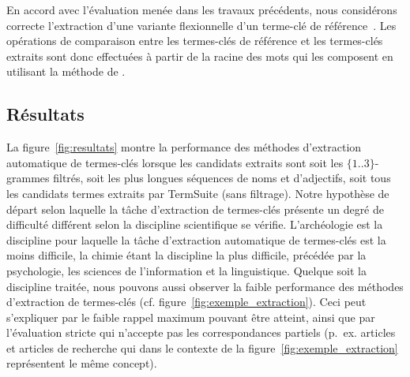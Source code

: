     En accord avec l'évaluation menée dans les travaux précédents, nous
    considérons correcte l'extraction d'une variante flexionnelle d'un terme-clé
    de référence~\cite{kim2010semeval}. Les opérations de comparaison entre les
    termes-clés de référence et les termes-clés extraits sont donc effectuées à
    partir de la racine des mots qui les composent en utilisant la méthode de
    .

  \subsection{Résultats}
  \label{subsec:resultats}
    La figure~\ref{fig:resultats} montre la performance des méthodes
    d'extraction automatique de termes-clés lorsque les candidats extraits sont
    soit les $\{1..3\}$-grammes filtrés, soit les plus longues séquences de noms
    et d'adjectifs, soit tous les candidats termes extraits par TermSuite (sans
    filtrage). Notre hypothèse de départ selon laquelle la tâche d'extraction de
    termes-clés présente un degré de difficulté différent selon la discipline
    scientifique se vérifie. L'archéologie est la discipline pour laquelle la
    tâche d'extraction automatique de termes-clés est la moins difficile, la
    chimie étant la discipline la plus difficile, précédée par la psychologie,
    les sciences de l'information et la linguistique. Quelque soit la discipline
    traitée, nous pouvons aussi observer la faible performance des méthodes
    d'extraction de termes-clés (cf. figure~\ref{fig:exemple_extraction}). Ceci
    peut s'expliquer par le faible rappel maximum pouvant être atteint, ainsi
    que par l'évaluation stricte qui n'accepte pas les correspondances partiels
    (p.~ex. \og{}articles\fg{} et \og{}articles de recherche\fg{} qui dans le
    contexte de la figure~\ref{fig:exemple_extraction} représentent le même
    concept).


